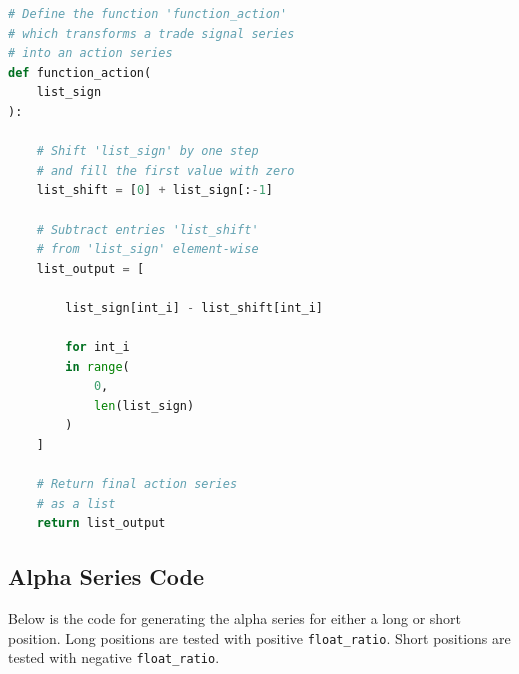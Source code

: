 \documentclass[11pt]{article}
\begin{document}
\begin{lstlisting}[language=Python]
# Define the function 'function_action'
# which transforms a trade signal series
# into an action series
def function_action(
    list_sign
):

    # Shift 'list_sign' by one step
    # and fill the first value with zero
    list_shift = [0] + list_sign[:-1]

    # Subtract entries 'list_shift' 
    # from 'list_sign' element-wise
    list_output = [

        list_sign[int_i] - list_shift[int_i]

        for int_i
        in range(
            0,
            len(list_sign)
        )
    ]

    # Return final action series
    # as a list
    return list_output
\end{lstlisting}

\subsection{Alpha Series Code}

Below is the code for generating the alpha series for either a long or short position. Long positions are tested with positive \texttt{float\_ratio}. Short positions are tested with negative \texttt{float\_ratio}.
\end{document}
